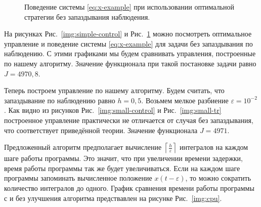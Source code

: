 \begin{figure}[bh]
        \noindent{}
        \caption{Поведение системы \eqref{eq:x-example} при использовании оптимальной стратегии без запаздывания наблюдения.}
        \label{img:simple-tr}
\end{figure}

На рисунках Рис.~\ref{img:simple-control} и Рис.~\ref{img:simple-tr} можно посмотреть оптимальное управление и поведение системы \eqref{eq:x-example} для задачи без запаздывания по наблюдению. С этими графиками мы будем сравнивать управления, построенные по нашему алгоритму. Значение функционала при такой постановке задачи равно $J = 4970,8$.

Теперь построем управление по нашему алгоритму. Будем считать, что запаздывание по наблюдению равно $h = 0,\!5$. Возьмем мелкое разбиение $\varepsilon = 10^{-2}$. Как видно из рисунков Рис.~\ref{img:small-control} и Рис.~\ref{img:small-tr} построенное управление практически не отличается от случая без запаздывания, что соответствует приведённой теории. Значение функционала $J = 4971$.

Предложенный алгоритм предполагает вычисление $\left\lceil\frac{h}{\varepsilon}\right\rceil$ интегралов на каждом шаге работы программы. Это значит, что при увеличении времени задержки, время работы программы так же будет увеличиваться. Если на каждом шаге программы запоминать вычисленное положение $x(t - \varepsilon)$, то можно сократить количество интегралов до одного. График сравнения времени работы программы с и без улучшения алгоритма предствавлен на рисунке Рис.~\ref{img:cpu}.

